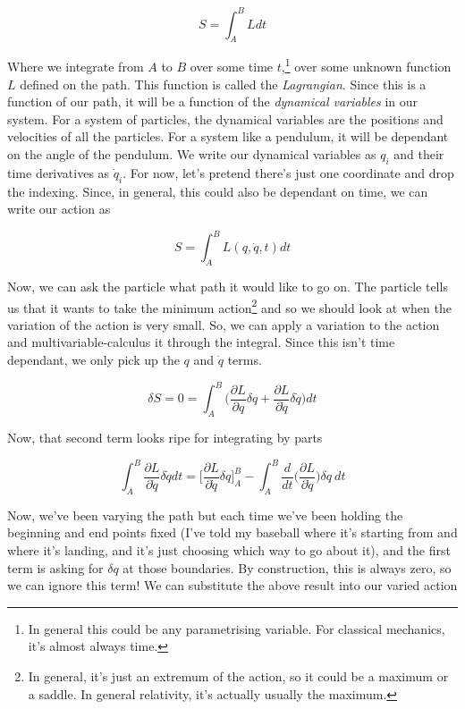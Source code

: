 \documentclass{article}
\begin{document}
\begin{equation}
    S = \int_A^B L dt
\end{equation}

Where we integrate from $A$ to $B$ over some time $t$,\footnote{In general this could be any parametrising variable. For classical mechanics, it's almost always time.} over some unknown function $L$ defined on the path. This function is called the \textit{Lagrangian}. Since this is a function of our path, it will be a function of the \textit{dynamical variables} in our system. For a system of particles, the dynamical variables are the positions and velocities of all the particles. For a system like a pendulum, it will be dependant on the angle of the pendulum. We write our dynamical variables as $q_i$ and their time derivatives as $\dot{q}_i$. For now, let's pretend there's just one coordinate and drop the indexing. Since, in general, this could also be dependant on time, we can write our action as

\begin{equation}
    S = \int_A^B L(q, \dot{q}, t) dt
\end{equation}

Now, we can ask the particle what path it would like to go on. The particle tells us that it wants to take the minimum action\footnote{In general, it's just an extremum of the action, so it could be a maximum or a saddle. In general relativity, it's actually usually the maximum.} and so we should look at when the variation of the action is very small. So, we can apply a variation to the action and multivariable-calculus it through the integral. Since this isn't time dependant, we only pick up the $q$ and $\dot{q}$ terms.

\begin{equation}
    \delta S = 0 = \int_A^B \biggl( \frac{\partial L}{\partial q}\delta q + \frac{\partial L}{\partial \dot{q}} \delta \dot{q} \biggr) dt
\end{equation}

Now, that second term looks ripe for integrating by parts

\begin{equation}
    \int_A^B \frac{\partial L}{\partial \dot{q}} \delta \dot{q} dt = \biggl[ \frac{\partial L}{\partial \dot{q}} \delta q \biggr]_A^B - \int_A^B \frac{d}{dt}\biggl(\frac{\partial L}{\partial \dot{q}}\biggr) \delta q~dt
\end{equation}

Now, we've been varying the path but each time we've been holding the beginning and end points fixed (I've told my baseball where it's starting from and where it's landing, and it's just choosing which way to go about it), and the first term is asking for $\delta q$ at those boundaries. By construction, this is always zero, so we can ignore this term! We can substitute the above result into our varied action
\end{document}
